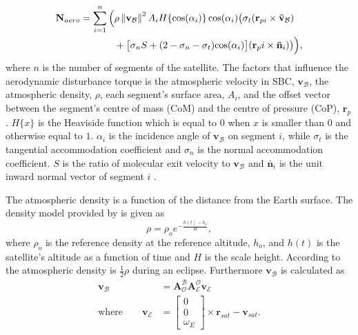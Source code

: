 \begin{equation}
\begin{aligned}
\mathbf{N}_{aero} = \sum_{i=1}^{n}\Big(& \rho \norm{\mathbf{v}_{\mathcal{B}}}^2 A_i H \{\text{cos}(\alpha_i)\} \, \text{cos}(\alpha_i) \big(\sigma_t (\mathbf{r}_{pi} \times \mathbf{\bar{v}}_{\mathcal{B}}) \\
					 & + \big[ \sigma_nS + (2 - \sigma_n - \sigma_t) \text{cos}(\alpha_i)\big] (\mathbf{r}_pi \times \mathbf{\bar{n}}_i) \big) \vphantom{\norm{\mathbf{v}_{\mathcal{B}}}^2}\Big),
\end{aligned}
\end{equation}
where $n$ is the number of segments of the satellite. The factors that influence the aerodynamic disturbance torque is the atmospheric velocity in SBC, $\mathbf{v}_{\mathcal{B}}$, the atmospheric density, $\rho$, each segment's surface area, $A_i$, and the offset vector between the segment's centre of mass (CoM) and the centre of pressure (CoP), $\mathbf{r}_p$. $H\{x\}$ is the Heaviside function which is equal to $0$ when $x$ is smaller than $0$ and otherwise equal to $1$. $\alpha_i$ is the incidence angle of $\mathbf{v}_{\mathcal{B}}$ on segment $i$, while $\sigma_t$ is the tangential accommodation coefficient and $\sigma_n$ is the normal accommodation coefficient. $S$ is the ratio of molecular exit velocity to $\mathbf{v}_{\mathcal{B}}$ and $\mathbf{\bar{n}}_i$ is the unit inward normal vector of segment $i$ \cite{JansevanVuuren2015}.

The atmospheric density is a function of the distance from the Earth surface. The density model provided by \cite{vallado2001fundamentals} is given as 
\begin{equation}
\rho = \rho_o e^{-\frac{h(t)-h_o}{H}},
\end{equation}
where $\rho_o$ is the reference density at the reference altitude, $h_o$, and $h(t)$ is the satellite's altitude as a function of time and $H$ is the scale height. According to \cite{steyn2011CubeSat} the atmospheric density is $\frac{1}{2}\rho$ during an eclipse. Furthermore $\mathbf{v}_{\mathcal{B}}$ is calculated as
\begin{equation}
\begin{aligned}
\mathbf{v}_{\mathcal{B}} &= \boldsymbol{A}^{\mathcal{B}}_{\mathcal{O}} \boldsymbol{A}_{\mathcal{E}}^{\mathcal{O}} \mathbf{v}_{\mathcal{E}} \\
\text{where}  \qquad \mathbf{v}_{\mathcal{E}} &= \begin{bmatrix} 0 \\ 0 \\ \omega_E \end{bmatrix} \times \mathbf{r}_{sat} - \mathbf{v}_{sat}.
\end{aligned}
\end{equation}

